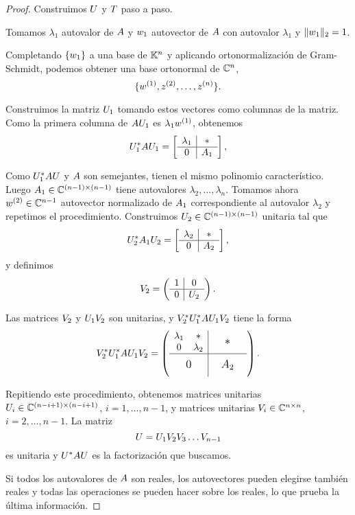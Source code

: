 \begin{proof}
Construimos $\Ub$ y $\Tb$ paso a paso.

Tomamos $\lambda_1$ autovalor de $\Ab$ y $\wb_1$ autovector de $\Ab$ con autovalor $\lambda_1$ y $\|\wb_1\|_2 = 1$.

Completando $\{\wb_1\}$ a una base de $\mathbb K^{n}$ y aplicando ortonormalización de Gram-Schmidt, podemos obtener una base ortonormal de $\mathbb C^n$,
$$
\{\wb^{(1)}, \zb^{(2)}, \dots, \zb^{(n)}\}.
$$

Construimos la matriz $\Ub_1$ tomando estos vectores como columnas de la matriz. Como la primera columna de $\Ab \Ub_1$ es $\lambda_1 \wb^{(1)}$, obtenemos
$$
\Ub_1^* \Ab \Ub_1 = \left[
\begin{array}{c|c}
\lambda_1 & * \\ \hline
0 & \Ab_1
\end{array}
\right],
$$

Como $\Ub_1^* \Ab \Ub$ y $\Ab$ son semejantes, tienen el mismo polinomio característico. Luego $\Ab_1 \in \C^{(n-1) \times (n-1)}$ tiene autovalores $\lambda_2, \dots, \lambda_n$. Tomamos ahora $\wb^{(2)} \in \C^{n-1}$ autovector normalizado de $\Ab_1$ correspondiente al autovalor $\lambda_2$ y repetimos el procedimiento. Construimos $\Ub_2 \in \C^{(n-1) \times (n-1)}$ unitaria tal que
$$
\Ub_2^* \Ab_1 \Ub_2 = \left[
\begin{array}{c|c}
\lambda_2 & * \\ \hline
0 & \Ab_2
\end{array}
\right],
$$
y definimos
$$
\Vb_2 = \left(
\begin{array}{c|c}
1 & 0 \\ \hline
0 & \Ub_2
\end{array}
\right).
$$

Las matrices $\Vb_2$ y $\Ub_1 \Vb_2$ son unitarias, y $\Vb_2^* \Ub_1^* \Ab \Ub_1 \Vb_2$ tiene la forma
$$
\sbox0{$\begin{matrix}\lambda_1 & * \\ 0 & \lambda_2 \end{matrix}$}
\Vb_2^* \Ub_1^* \Ab \Ub_1 \Vb_2 =\left(
\begin{array}{c|c}
\usebox{0}& \makebox[\wd0]{\large $*$}\\
\hline
    \vphantom{\usebox{0}}\makebox[\wd0]{\large $0$}&\makebox[\wd0]{\large $\Ab_2$}
\end{array}
\right).
$$

Repitiendo este procedimiento, obtenemos matrices unitarias $\Ub_i \in \C^{(n-i+1) \times (n-i+1)}$, $i = 1, \dots, n-1$, y matrices unitarias $\Vb_i \in \Cnn$, $i = 2, \dots, n-1$. La matriz
$$
\Ub = \Ub_1 \Vb_2 \Vb_3 \dots \Vb_{n-1}
$$
es unitaria y $\Ub^* \Ab \Ub$ es la factorización que buscamos.

Si todos los autovalores de $\Ab$ son reales, los autovectores pueden elegirse también reales y todas las operaciones se pueden hacer sobre los reales, lo que prueba la última información.
\end{proof}

